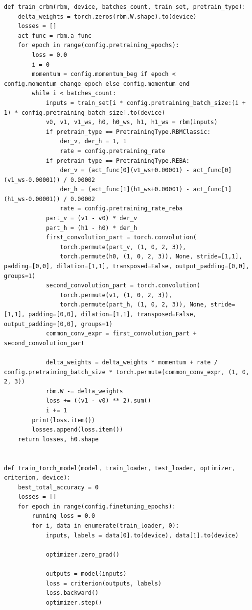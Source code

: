 \begin{lstlisting}[style=PythonStyle]
def train_crbm(rbm, device, batches_count, train_set, pretrain_type):
    delta_weights = torch.zeros(rbm.W.shape).to(device)
    losses = []
    act_func = rbm.a_func
    for epoch in range(config.pretraining_epochs):
        loss = 0.0
        i = 0
        momentum = config.momentum_beg if epoch < config.momentum_change_epoch else config.momentum_end
        while i < batches_count:
            inputs = train_set[i * config.pretraining_batch_size:(i + 1) * config.pretraining_batch_size].to(device)
            v0, v1, v1_ws, h0, h0_ws, h1, h1_ws = rbm(inputs)
            if pretrain_type == PretrainingType.RBMClassic:
                der_v, der_h = 1, 1
                rate = config.pretraining_rate
            if pretrain_type == PretrainingType.REBA:
                der_v = (act_func[0](v1_ws+0.00001) - act_func[0](v1_ws-0.00001)) / 0.00002
                der_h = (act_func[1](h1_ws+0.00001) - act_func[1](h1_ws-0.00001)) / 0.00002
                rate = config.pretraining_rate_reba
            part_v = (v1 - v0) * der_v
            part_h = (h1 - h0) * der_h
            first_convolution_part = torch.convolution(
                torch.permute(part_v, (1, 0, 2, 3)),
                torch.permute(h0, (1, 0, 2, 3)), None, stride=[1,1], padding=[0,0], dilation=[1,1], transposed=False, output_padding=[0,0], groups=1)
            second_convolution_part = torch.convolution(
                torch.permute(v1, (1, 0, 2, 3)),
                torch.permute(part_h, (1, 0, 2, 3)), None, stride=[1,1], padding=[0,0], dilation=[1,1], transposed=False, output_padding=[0,0], groups=1)
            common_conv_expr = first_convolution_part + second_convolution_part

            delta_weights = delta_weights * momentum + rate / config.pretraining_batch_size * torch.permute(common_conv_expr, (1, 0, 2, 3))
            rbm.W -= delta_weights
            loss += ((v1 - v0) ** 2).sum()
            i += 1
        print(loss.item())
        losses.append(loss.item())
    return losses, h0.shape


def train_torch_model(model, train_loader, test_loader, optimizer, criterion, device):
    best_total_accuracy = 0
    losses = []
    for epoch in range(config.finetuning_epochs):
        running_loss = 0.0
        for i, data in enumerate(train_loader, 0):
            inputs, labels = data[0].to(device), data[1].to(device)

            optimizer.zero_grad()

            outputs = model(inputs)
            loss = criterion(outputs, labels)
            loss.backward()
            optimizer.step()


\end{lstlisting}
